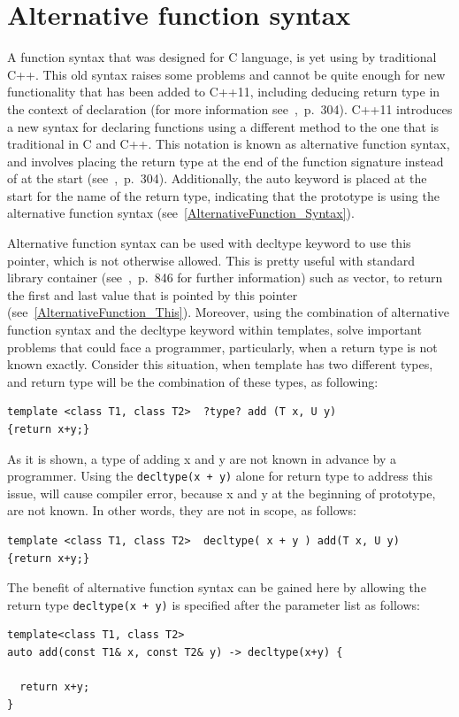 \documentclass[11pt]{report}
\begin{document}
\section{Alternative function syntax}
\label{section: Alternative function syntax}
A function syntax that was designed for C language, is yet using by traditional C++. This old syntax raises some problems and cannot be quite enough for new functionality that has been added to C++11, including deducing return type in the context of declaration (for more information see~\cite{Gregorie:professionalcpp},~p.~304). C++11 introduces a new syntax for declaring functions using a different method to the one that is traditional in C and C++. This notation is known as alternative function syntax, and involves placing the return type at the end of the function signature instead of at the start (see~\cite{Gregorie:professionalcpp},~p.~304). Additionally, the auto keyword is placed at the start for the name of the return type, indicating that the prototype is using the alternative function syntax (see~\ref{AlternativeFunction_Syntax}).

Alternative function syntax can be used with decltype keyword to use this pointer, which is not otherwise allowed. This is pretty useful with standard library container (see~\cite{ISO:2011:Cpplanguage},~p.~846 for further information) such as vector, to return the first and last value that is pointed by this pointer (see~\ref{AlternativeFunction_This}). Moreover, using the combination of alternative function syntax and the decltype keyword within templates, solve important problems that could face a programmer, particularly, when a return type is not known exactly. Consider this situation, when template has two different types, and return type will be the combination of these types, as following:
\begin{lstlisting}
template <class T1, class T2>  ?type? add (T x, U y) 
{return x+y;}
\end{lstlisting}
As it is shown, a type of adding x and y are not known in advance by a programmer. Using the \texttt{decltype(x + y)} alone for return type to address this issue, will cause compiler error, because x and y at the beginning of prototype, are not known. In other words, they are not in scope, as follows:
\begin{lstlisting}
template <class T1, class T2>  decltype( x + y ) add(T x, U y)
{return x+y;}
\end{lstlisting}
The benefit of alternative function syntax can be gained here by allowing the return type \texttt{decltype(x + y)} is specified after the parameter list as follows:
\begin{lstlisting}
template<class T1, class T2>
auto add(const T1& x, const T2& y) -> decltype(x+y) {

  return x+y;
}
\end{lstlisting}
\end{document}
